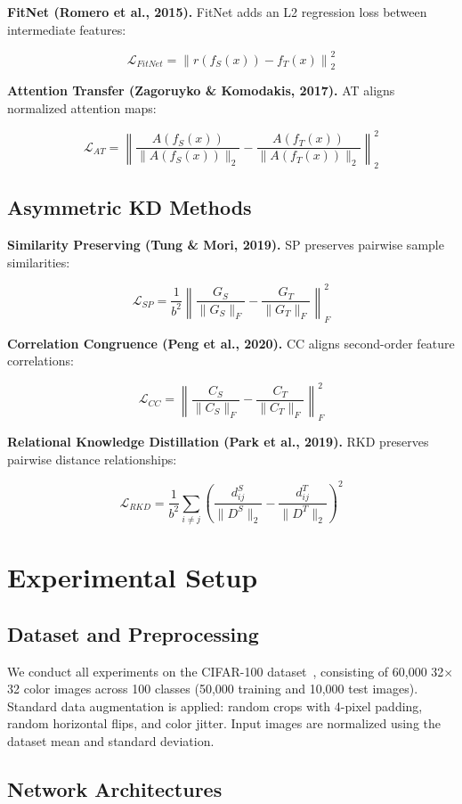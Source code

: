 \documentclass[symmetry,article,submit,pdftex,moreauthors]{Definitions/mdpi}
\begin{document}
\textbf{FitNet (Romero et al., 2015).} FitNet adds an L2 regression loss between intermediate features:

$$\mathcal{L}_{FitNet} = \left\| r(f_S(x)) - f_T(x) \right\|_2^2$$

\textbf{Attention Transfer (Zagoruyko \& Komodakis, 2017).} AT aligns normalized attention maps:

$$\mathcal{L}_{AT} = \left\| \frac{A(f_S(x))}{\|A(f_S(x))\|_2} - \frac{A(f_T(x))}{\|A(f_T(x))\|_2} \right\|_2^2$$

\subsection{Asymmetric KD Methods}

\textbf{Similarity Preserving (Tung \& Mori, 2019).} SP preserves pairwise sample similarities:

$$\mathcal{L}_{SP} = \frac{1}{b^2} \left\| \frac{G_S}{\|G_S\|_F} - \frac{G_T}{\|G_T\|_F} \right\|_F^2$$

\textbf{Correlation Congruence (Peng et al., 2020).} CC aligns second-order feature correlations:

$$\mathcal{L}_{CC} = \left\| \frac{C_S}{\|C_S\|_F} - \frac{C_T}{\|C_T\|_F} \right\|_F^2$$

\textbf{Relational Knowledge Distillation (Park et al., 2019).} RKD preserves pairwise distance relationships:

$$\mathcal{L}_{RKD} = \frac{1}{b^2} \sum_{i \neq j} \left( \frac{d_{ij}^S}{\|D^S\|_2} - \frac{d_{ij}^T}{\|D^T\|_2} \right)^2$$

\section{Experimental Setup}

\subsection{Dataset and Preprocessing}

We conduct all experiments on the CIFAR-100 dataset~\cite{ref19}, consisting of 60,000 32$\times$32 color images across 100 classes (50,000 training and 10,000 test images). Standard data augmentation is applied: random crops with 4-pixel padding, random horizontal flips, and color jitter. Input images are normalized using the dataset mean and standard deviation.

\subsection{Network Architectures}
\end{document}
